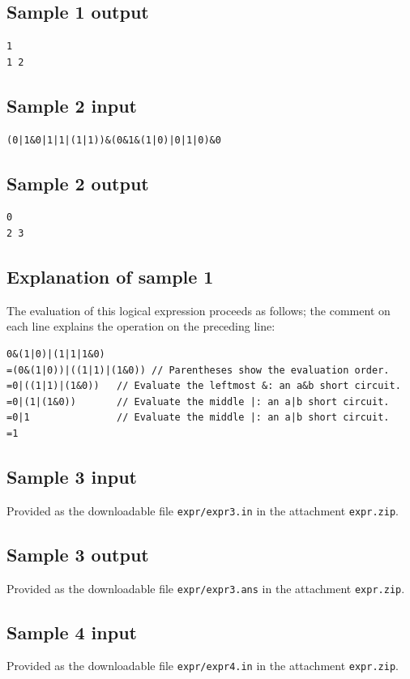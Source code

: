 \documentclass[11pt]{article}
\begin{document}
\subsection*{Sample 1 output}
\begin{verbatim}
1
1 2
\end{verbatim}

\subsection*{Sample 2 input}
\begin{verbatim}
(0|1&0|1|1|(1|1))&(0&1&(1|0)|0|1|0)&0
\end{verbatim}

\subsection*{Sample 2 output}
\begin{verbatim}
0
2 3
\end{verbatim}

\subsection*{Explanation of sample 1}
The evaluation of this logical expression proceeds as follows;
the comment on each line explains the operation on the preceding line:
\begin{verbatim}
0&(1|0)|(1|1|1&0)
=(0&(1|0))|((1|1)|(1&0)) // Parentheses show the evaluation order.
=0|((1|1)|(1&0))   // Evaluate the leftmost &: an a&b short circuit.
=0|(1|(1&0))       // Evaluate the middle |: an a|b short circuit.
=0|1               // Evaluate the middle |: an a|b short circuit.
=1
\end{verbatim}

\subsection*{Sample 3 input}
Provided as the downloadable file \texttt{expr/expr3.in}
in the attachment \texttt{expr.zip}.

\subsection*{Sample 3 output}
Provided as the downloadable file \texttt{expr/expr3.ans}
in the attachment \texttt{expr.zip}.

\subsection*{Sample 4 input}
Provided as the downloadable file \texttt{expr/expr4.in}
in the attachment \texttt{expr.zip}.
\end{document}
